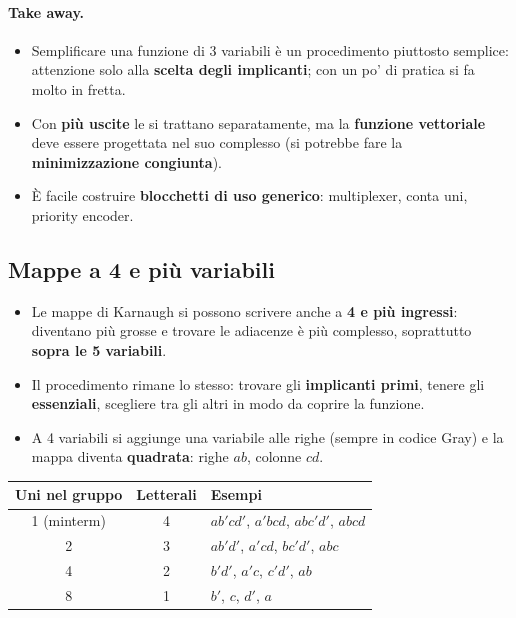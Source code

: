 \documentclass[12pt, a4paper]{article}
\begin{document}
\paragraph{Take away.}
\begin{itemize}
    \item Semplificare una funzione di 3 variabili è un procedimento piuttosto semplice: attenzione solo alla \textbf{scelta degli implicanti}; con un po' di pratica si fa molto in fretta.
    \item Con \textbf{più uscite} le si trattano separatamente, ma la \textbf{funzione vettoriale} deve essere progettata nel suo complesso (si potrebbe fare la \textbf{minimizzazione congiunta}).
    \item È facile costruire \textbf{blocchetti di uso generico}: multiplexer, conta uni, priority encoder.
\end{itemize}

\subsection{Mappe a 4 e più variabili}

\begin{itemize}
    \item Le mappe di Karnaugh si possono scrivere anche a \textbf{4 e più ingressi}: diventano più grosse e trovare le adiacenze è più complesso, soprattutto \textbf{sopra le 5 variabili}.
    \item Il procedimento rimane lo stesso: trovare gli \textbf{implicanti primi}, tenere gli \textbf{essenziali}, scegliere tra gli altri in modo da coprire la funzione.
    \item A 4 variabili si aggiunge una variabile alle righe (sempre in codice Gray) e la mappa diventa \textbf{quadrata}: righe $ab$, colonne $cd$.
\end{itemize}

\begin{center}
\renewcommand{\arraystretch}{1.35}
\begin{tabular}{|c|c|l|}
\hline
\colorbox{gray!25}{\color{black}\textbf{Uni nel gruppo}} & \colorbox{gray!25}{\color{black}\textbf{Letterali}} & \colorbox{gray!25}{\color{black}\textbf{Esempi}} \\ \hline
1 (minterm) & 4 & $ab'cd'$, $a'bcd$, $abc'd'$, $abcd$ \\ \hline
2 & 3 & $ab'd'$, $a'cd$, $bc'd'$, $abc$ \\ \hline
4 & 2 & $b'd'$, $a'c$, $c'd'$, $ab$ \\ \hline
8 & 1 & $b'$, $c$, $d'$, $a$ \\ \hline
\end{tabular}
\end{center}
\end{document}
